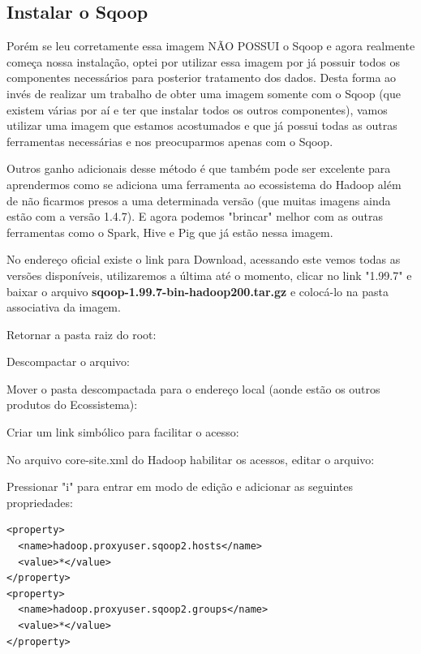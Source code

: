 \documentclass[a4paper,11pt]{article}
\begin{document}


\subsection{Instalar o Sqoop}
Porém se leu corretamente essa imagem NÃO POSSUI o Sqoop e agora realmente começa nossa instalação, optei por utilizar essa imagem por já possuir todos os componentes necessários para posterior tratamento dos dados. Desta forma ao invés de realizar um trabalho de obter uma imagem somente com o Sqoop (que existem várias por aí e ter que instalar todos os outros componentes), vamos utilizar uma imagem que estamos acostumados e que já possui todas as outras ferramentas necessárias e nos preocuparmos apenas com o Sqoop.

Outros ganho adicionais desse método é que também pode ser excelente para aprendermos como se adiciona uma ferramenta ao ecossistema do Hadoop além de não ficarmos presos a uma determinada versão (que muitas imagens ainda estão com a versão 1.4.7). E agora podemos "brincar" melhor com as outras ferramentas como o Spark, Hive e Pig que já estão nessa imagem.

No endereço oficial \cite{scoopoficial} existe o link para Download, acessando este vemos todas as versões disponíveis, utilizaremos a última até o momento, clicar no link "1.99.7" e baixar o arquivo \textbf{sqoop-1.99.7-bin-hadoop200.tar.gz} e colocá-lo na pasta associativa da imagem.

Retornar a pasta raiz do root: \\

Descompactar o arquivo: \\

Mover o pasta descompactada para o endereço local (aonde estão os outros produtos do Ecossistema): \\

Criar um link simbólico para facilitar o acesso: \\

No arquivo core-site.xml do Hadoop habilitar os acessos, editar o arquivo: \\

Pressionar "i" para entrar em modo de edição e adicionar as seguintes propriedades:
\begin{lstlisting}[]
<property>
  <name>hadoop.proxyuser.sqoop2.hosts</name>
  <value>*</value>
</property>
<property>
  <name>hadoop.proxyuser.sqoop2.groups</name>
  <value>*</value>
</property>
\end{lstlisting}
\end{document}
